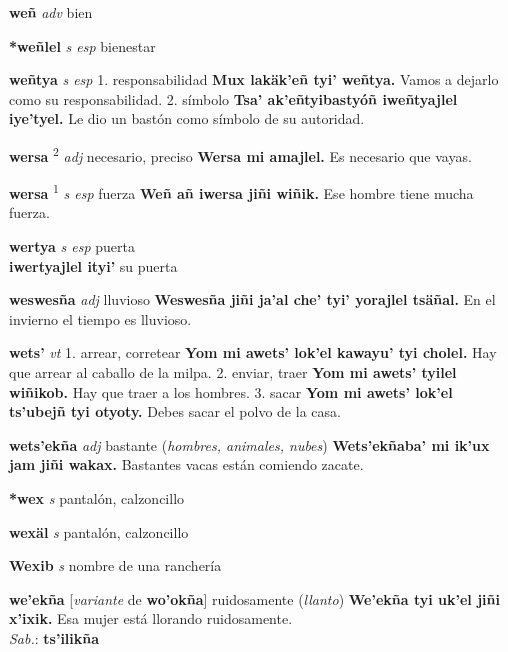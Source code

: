 \documentclass[10pt]{scrbook}
\newcommand{\entry}[1]{\textbf{#1}}
\newcommand{\onedefinition}[1]{#1.}
\newcommand{\defsuperscript}[1]{\textsuperscript{#1}}
\newcommand{\partofspeech}[1]{\textit{#1}}
\newcommand{\spanishtranslation}[1]{#1}
\newcommand{\clarification}[1]{(\textit{#1})}
\newcommand{\cholexample}[1]{\textbf{#1}}
\newcommand{\exampletranslation}[1]{#1}
\newcommand{\dialectvariant}[1]{\\\textit{#1}:}
\newcommand{\dialectword}[1]{\textbf{#1}}
\newcommand{\secondaryentry}[1]{\\\textbf{#1}}
\newcommand{\secondtranslation}[1]{#1}
\newcommand{\conjugationtense}[1]{[\textit{#1}}
\newcommand{\conjugationverb}[1]{de \textbf{#1}]}
\begin{document}
\begin{multicols}{2}
\entry{weñ}
\partofspeech{adv}
\spanishtranslation{bien}

\entry{*weñlel}
\partofspeech{s esp}
\spanishtranslation{bienestar}

\entry{weñtya}
\partofspeech{s esp}
\onedefinition{1}
\spanishtranslation{responsabilidad}
\cholexample{Mux lakäk'eñ tyi' weñtya.}
\exampletranslation{Vamos a dejarlo como su responsabilidad.}
\onedefinition{2}
\spanishtranslation{símbolo}
\cholexample{Tsa' ak'eñtyibastyóñ iweñtyajlel iye'tyel.}
\exampletranslation{Le dio un bastón como símbolo de su autoridad.}

\entry{wersa}
\defsuperscript{2}
\partofspeech{adj}
\spanishtranslation{necesario, preciso}
\cholexample{Wersa mi amajlel.}
\exampletranslation{Es necesario que vayas.}

\entry{wersa}
\defsuperscript{1}
\partofspeech{s esp}
\spanishtranslation{fuerza}
\cholexample{Weñ añ iwersa jiñi wiñik.}
\exampletranslation{Ese hombre tiene mucha fuerza.}

\entry{wertya}
\partofspeech{s esp}
\spanishtranslation{puerta}
\secondaryentry{iwertyajlel ityi'}
\secondtranslation{su puerta}

\entry{weswesña}
\partofspeech{adj}
\spanishtranslation{lluvioso}
\cholexample{Weswesña jiñi ja'al che' tyi' yorajlel tsäñal.}
\exampletranslation{En el invierno el tiempo es lluvioso.}

\entry{wets'}
\partofspeech{vt}
\onedefinition{1}
\spanishtranslation{arrear, corretear}
\cholexample{Yom mi awets' lok'el kawayu' tyi cholel.}
\exampletranslation{Hay que arrear al caballo de la milpa.}
\onedefinition{2}
\spanishtranslation{enviar, traer}
\cholexample{Yom mi awets' tyilel wiñikob.}
\exampletranslation{Hay que traer a los hombres.}
\onedefinition{3}
\spanishtranslation{sacar}
\cholexample{Yom mi awets' lok'el ts'ubejñ tyi otyoty.}
\exampletranslation{Debes sacar el polvo de la casa.}

\entry{wets'ekña}
\partofspeech{adj}
\spanishtranslation{bastante}
\clarification{hombres, animales, nubes}
\cholexample{Wets'ekñaba' mi ik'ux jam jiñi wakax.}
\exampletranslation{Bastantes vacas están comiendo zacate.}

\entry{*wex}
\partofspeech{s}
\spanishtranslation{pantalón, calzoncillo}

\entry{wexäl}
\partofspeech{s}
\spanishtranslation{pantalón, calzoncillo}

\entry{Wexib}
\partofspeech{s}
\spanishtranslation{nombre de una ranchería}

\entry{we'ekña}
\conjugationtense{variante}
\conjugationverb{wo'okña}
\spanishtranslation{ruidosamente}
\clarification{llanto}
\cholexample{We'ekña tyi uk'el jiñi x'ixik.}
\exampletranslation{Esa mujer está llorando ruidosamente.}
\dialectvariant{Sab.}
\dialectword{ts'ilikña}


\end{multicols}
\end{document}
